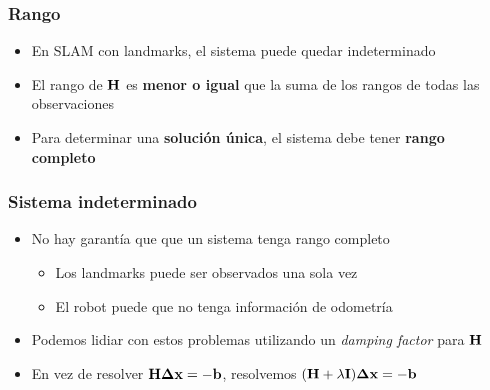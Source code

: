 \begin{frame}
    \frametitle{Rango}
    \begin{itemize}
        \item En SLAM con landmarks, el sistema puede quedar indeterminado
        \item El rango de $\boldsymbol{\mathbf{H}}$ es {\bf menor o igual} que la suma de los rangos de todas las observaciones
        \item Para determinar una {\bf solución única}, el sistema debe tener {\bf rango completo}
    \end{itemize}
\end{frame}

\begin{frame}
    \frametitle{Sistema indeterminado}
    \begin{itemize}
        \item No hay garantía que que un sistema tenga rango completo
        \begin{itemize}
            \item Los landmarks puede ser observados una sola vez 
            \item El robot puede que no tenga información de odometría
        \end{itemize}
        \item Podemos lidiar con estos problemas utilizando un \emph{damping factor} para $\boldsymbol{\mathbf{H}}$
        \item En vez de resolver $\boldsymbol{\mathbf{H}} \boldsymbol{\mathbf{\Delta}} \boldsymbol{\mathbf{x}} = - \boldsymbol{\mathbf{b}}$, resolvemos
        $(\boldsymbol{\mathbf{H}} + \lambda \boldsymbol{\mathbf{I}}) \boldsymbol{\mathbf{\Delta}} \boldsymbol{\mathbf{x}} = - \boldsymbol{\mathbf{b}}$
    \end{itemize}
\end{frame}

